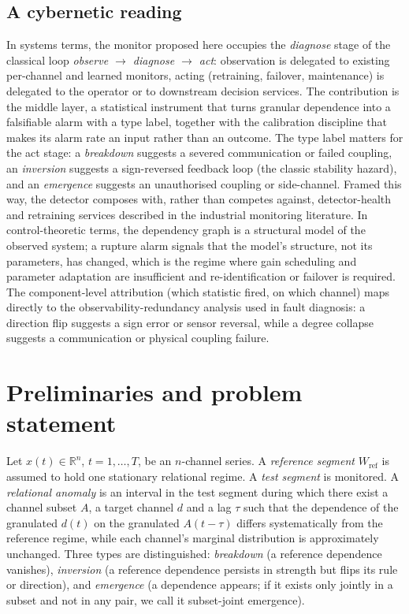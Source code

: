 \documentclass[11pt,a4paper]{article}
\begin{document}
\subsection*{A cybernetic reading}
In systems terms, the monitor proposed here occupies the \emph{diagnose}
stage of the classical loop \emph{observe $\rightarrow$ diagnose $\rightarrow$
act}: observation is delegated to existing per-channel and learned monitors,
acting (retraining, failover, maintenance) is delegated to the operator or to
downstream decision services. The contribution is the middle layer, a
statistical instrument that turns granular dependence into a falsifiable
alarm with a type label, together with the calibration discipline that
makes its alarm rate an input rather than an outcome. The type label
matters for the act stage: a \emph{breakdown} suggests a severed
communication or failed coupling, an \emph{inversion} suggests a
sign-reversed feedback loop (the classic stability hazard), and an
\emph{emergence} suggests an unauthorised coupling or side-channel.
Framed this way, the detector composes with, rather than competes
against, detector-health and retraining services described in the
industrial monitoring literature. In control-theoretic terms, the
dependency graph is a structural model of the observed system; a
rupture alarm signals that the model's structure, not its parameters,
has changed, which is the regime where gain scheduling and parameter
adaptation are insufficient and re-identification or failover is
required. The component-level attribution (which statistic fired, on
which channel) maps directly to the observability-redundancy analysis
used in fault diagnosis: a direction flip suggests a sign error or
sensor reversal, while a degree collapse suggests a communication or
physical coupling failure.

\section{Preliminaries and problem statement}\label{sec:prelim}

Let $x(t)\in\mathbb{R}^n$, $t=1,\dots,T$, be an $n$-channel series. A
\emph{reference segment} $W_{\mathrm{ref}}$ is assumed to hold one stationary
relational regime. A \emph{test segment} is monitored. A \emph{relational
anomaly} is an interval in the test segment during which there exist a channel
subset $A$, a target channel $d$ and a lag $\tau$ such that the dependence of
the granulated $d(t)$ on the granulated $A(t-\tau)$ differs systematically
from the reference regime, while each channel's marginal distribution is
approximately unchanged. Three types are distinguished: \emph{breakdown} (a
reference dependence vanishes), \emph{inversion} (a reference dependence
persists in strength but flips its rule or direction), and \emph{emergence} (a
dependence appears; if it exists only jointly in a subset and not in any pair,
we call it subset-joint emergence).
\end{document}
